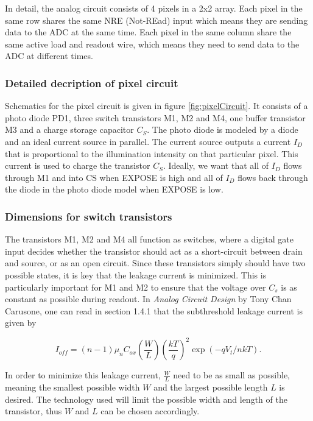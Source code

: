 In detail, the analog circuit consists of 4 pixels in a 2x2 array. Each pixel in the same row shares the same NRE (Not-REad) input which means they are sending data to the ADC at the same time. Each pixel in the same column share the same active load and readout wire, which means they need to send data to the ADC at different times.

\subsubsection{Detailed decription of pixel circuit}

Schematics for the pixel circuit is given in figure \ref{fig:pixelCircuit}. It consists of a photo diode PD1, three switch transistors M1, M2 and M4, one buffer transistor M3 and a charge storage capacitor $C_S$. The photo diode is modeled by a diode and an ideal current source in parallel. The current source outputs a current $I_D$ that is proportional to the illumination intensity on that particular pixel. This current is used to charge the transistor $C_S$. Ideally, we want that all of $I_D$ flows through M1 and into CS when EXPOSE is high and all of $I_D$ flows back through the diode in the photo diode model when EXPOSE is low.

\subsubsection{Dimensions for switch transistors}
\label{sec:switch_dimensions}
The transistors M1, M2 and M4 all function as switches, where a digital gate input decides whether the transistor should act as a short-circuit between drain and source, or as an open circuit. Since these transistors simply should have two possible states, it is key that the leakage current is minimized. This is particularly important for M1 and M2 to ensure that the voltage over $C_s$ is as constant as possible during readout. In \emph{Analog Circuit Design} by Tony Chan Carusone, one can read in section 1.4.1 that the subthreshold leakage current is given by

\begin{equation}
    \label{eq:leakage}
    I_{off} = (n-1) \mu_n C_{ox} \left( \frac{W}{L} \right) \left( \frac{kT}{q} \right)^2 \exp{(-qV_t / nkT)}.
\end{equation}

In order to minimize this leakage current, $\frac{W}{L}$ need to be as small as possible, meaning the smallest possible width $W$ and the largest possible length $L$ is desired. The technology used will limit the possible width and length of the transistor, thus $W$ and $L$ can be chosen accordingly.

